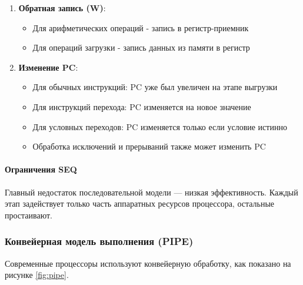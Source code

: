 \documentclass[12pt,a4paper]{article}
\begin{document}
\begin{enumerate}
    \item  \textbf{Обратная запись (W)}:
    \begin{itemize}
        \item Для арифметических операций - запись в регистр-приемник
        \item Для операций загрузки - запись данных из памяти в регистр
    \end{itemize}

    \item \textbf{Изменение PC}:
    \begin{itemize}
        \item Для обычных инструкций: PC уже был увеличен на этапе выгрузки
        \item Для инструкций перехода: PC изменяется на новое значение
        \item Для условных переходов: PC изменяется только если условие истинно
        \item Обработка исключений и прерываний также может изменить PC
    \end{itemize}
\end{enumerate}

\paragraph{Ограничения SEQ}
Главный недостаток последовательной модели — низкая эффективность. Каждый этап задействует только часть аппаратных ресурсов процессора, остальные простаивают.

\subsubsection{Конвейерная модель выполнения (PIPE)}
Современные процессоры используют конвейерную обработку, как показано на рисунке \ref{fig:pipe}.
\end{document}
